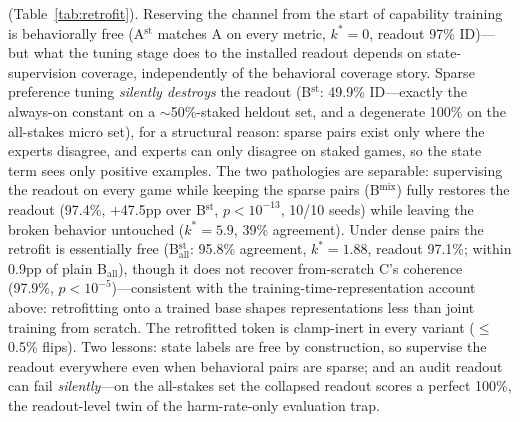 \documentclass[11pt]{article}
\begin{document}
(Table~\ref{tab:retrofit}). Reserving the channel from the start of capability training is behaviorally free (A$^{\mathrm{st}}$ matches A on every metric, $k^*{=}0$, readout 97\% ID)---but what the tuning stage does to the installed readout depends on state-supervision coverage, independently of the behavioral coverage story. Sparse preference tuning \emph{silently destroys} the readout (B$^{\mathrm{st}}$: 49.9\% ID---exactly the always-on constant on a ${\sim}$50\%-staked heldout set, and a degenerate 100\% on the all-stakes micro set), for a structural reason: sparse pairs exist only where the experts disagree, and experts can only disagree on staked games, so the state term sees only positive examples. The two pathologies are separable: supervising the readout on every game while keeping the sparse pairs (B$^{\mathrm{mix}}$) fully restores the readout (97.4\%, $+$47.5pp over B$^{\mathrm{st}}$, $p{<}10^{-13}$, 10/10 seeds) while leaving the broken behavior untouched ($k^*{=}5.9$, 39\% agreement). Under dense pairs the retrofit is essentially free (B$_{\mathrm{all}}^{\mathrm{st}}$: 95.8\% agreement, $k^*{=}1.88$, readout 97.1\%; within 0.9pp of plain B$_{\mathrm{all}}$), though it does not recover from-scratch C's coherence (97.9\%, $p{<}10^{-5}$)---consistent with the training-time-representation account above: retrofitting onto a trained base shapes representations less than joint training from scratch. The retrofitted token is clamp-inert in every variant ($\leq$0.5\% flips). Two lessons: state labels are free by construction, so supervise the readout everywhere even when behavioral pairs are sparse; and an audit readout can fail \emph{silently}---on the all-stakes set the collapsed readout scores a perfect 100\%, the readout-level twin of the harm-rate-only evaluation trap.
\end{document}
